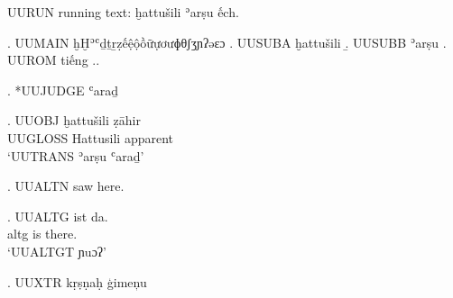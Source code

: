 

UURUN running text: ḫattušili ʾarṣu ếch.

\ex. UUMAIN ḫḪʾʿḏṯṟẓếệộồữựơưɸθʃʒɲʔəɛɔ
\a. UUSUBA ḫattušili
\b. UUSUBB ʾarṣu
\a. UUROM tiếng
\z.\z.

\ex. *UUJUDGE ʿaraḏ

\exg. UUOBJ ḫattušili ẓāhir\\ UUGLOSS Hattusili apparent\\
\glt `UUTRANS ʾarṣu ʿaraḏ'

\ex. UUALTN saw  here.

\exg. UUALTG  ist da.\\
      altg  is there.\\
\glt `UUALTGT ɲuɔʔ'

\ex. UUXTR kṛṣṇaḥ ģimeņu

